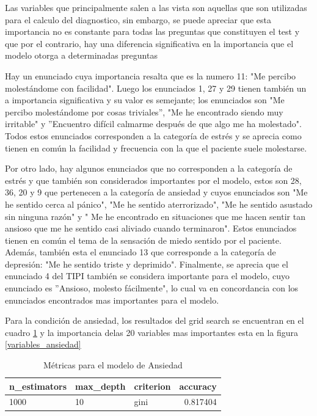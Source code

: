 \medbreak

Las variables que principalmente salen a las vista son aquellas que son utilizadas para el calculo del diagnostico, sin embargo, se puede apreciar que esta importancia no es constante para todas las preguntas que constituyen el test y que por el contrario, hay una diferencia significativa en la importancia que el modelo otorga a determinadas preguntas

 \medbreak

Hay un enunciado cuya importancia resalta que es la numero 11: "Me percibo molestándome con facilidad". Luego los enunciados 1, 27 y 29 tienen también un a importancia significativa y su valor es semejante; los enunciados son "Me percibo molestándome por cosas triviales'', "Me he encontrado siendo muy irritable" y ''Encuentro difícil calmarme después de que algo me ha molestado". Todos estos enunciados corresponden a la categoría de estrés y se aprecia como tienen en común la facilidad y frecuencia con la que el paciente suele molestarse.

 \medbreak
 
 Por otro lado, hay algunos enunciados que no corresponden a la categoría de estrés y que también son considerados importantes por el modelo, estos son 28, 36, 20 y 9 que pertenecen a la categoría de ansiedad y cuyos enunciados son "Me he sentido cerca al pánico", "Me he sentido aterrorizado", "Me he sentido asustado sin ninguna razón" y " Me he encontrado en situaciones que me hacen sentir tan ansioso que me he sentido casi aliviado cuando terminaron". Estos enunciados tienen en común el tema de la sensación de miedo sentido por el paciente. Además, también esta el enunciado 13 que corresponde a la categoría de depresión: "Me he sentido triste y deprimido". Finalmente, se aprecia que el enunciado 4 del TIPI también se considera importante para el modelo, cuyo enunciado es ''Ansioso, molesto fácilmente", lo cual va en concordancia con los enunciados encontrados mas importantes para el modelo.
 

 \medbreak
 
 Para la condición de ansiedad, los resultados del grid search se encuentran en el cuadro \ref{table:modelo_ansiedad} y la importancia delas 20 variables mas importantes esta en la figura \ref{variables_ansiedad} 
 

\begin{table}[ht]
\centering
\caption{Métricas para el modelo de Ansiedad}
\begin{tabular}{lllr}
\toprule
n\_estimators & max\_depth & criterion &  accuracy \\
\midrule
1000 & 10 & gini & 0.817404 \\
\bottomrule
\end{tabular}
\label{table:modelo_ansiedad}
\end{table}%

